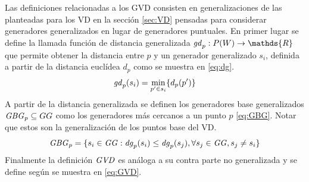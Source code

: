 Las definiciones relacionadas a los GVD consisten en generalizaciones de
las planteadas para los VD en la sección \ref{sec:VD} pensadas para considerar
generadores generalizados en lugar de generadores puntuales. 
En primer lugar se define la llamada función de distancia generalizada
$\mli{gd}_p : P(W) \rightarrow \mathds{R}$ que permite obtener la distancia entre
$p$ y un generador generalizado $s_i$, definida a partir de la distancia
euclídea $d_p$ como se muestra en \eqref{eq:dg}.
\begin{equation}
  \mathit{gd}_p(s_i) = \min_{p'\in s_i}\{d_p(p')\} \label{eq:dg}
\end{equation}
A partir de la distancia generalizada se definen los generadores base
generalizados $\mathit{GBG}_p\subseteq GG$ como los generadores más
cercanos a un punto $p$ \eqref{eq:GBG}. Notar que estos son la
generalización de los puntos base del VD.
\begin{equation}
  \mathit{GBG}_p = \{s_i \in \mathit{GG}: \mathit{dg}_p(s_i) \leq \mathit{dg}_p(s_j), \forall s_j\in \mathit{GG}, s_j \neq s_i\}\label{eq:GBG}
\end{equation}
Finalmente la definición $\mathit{GVD}$ es análoga a su contra parte no
generalizada y se define según se muestra en \eqref{eq:GVD}. 


